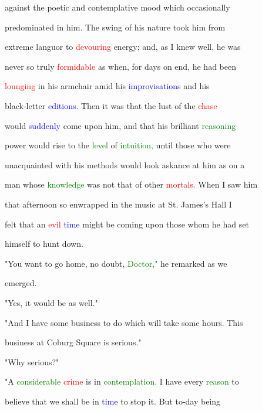 against the poetic and contemplative mood which occasionally

 predominated in him. The swing of his nature took him from

 extreme languor to \textcolor{red}{devouring} energy; and, as I knew well, he was

 never so truly \textcolor{red}{formidable} as when, for days on end, he had been

 \textcolor{red}{lounging} in his armchair amid his \textcolor{blue}{improvisations} and his

 black-letter \textcolor{blue}{editions.} Then it was that the \textcolor{BurntOrange}{lust} of the \textcolor{red}{chase}

 would \textcolor{blue}{suddenly} come upon him, and that his \textcolor{BurntOrange}{brilliant} \textcolor{green}{reasoning}

 power would rise to the \textcolor{green}{level} of \textcolor{green}{intuition,} until those who were

 unacquainted with his methods would look askance at him as on a

 man whose \textcolor{green}{knowledge} was not that of other \textcolor{red}{mortals.} When I saw him

 that afternoon so enwrapped in the \textcolor{BurntOrange}{music} at St. James's Hall I

 felt that an \textcolor{red}{evil} \textcolor{blue}{time} might be coming upon those whom he had set

 himself to hunt down.



 "You want to go home, no \textcolor{BurntOrange}{doubt,} \textcolor{green}{Doctor,"} he remarked as we

 emerged.



 "Yes, it would be as well."



 "And I have some business to do which will take some hours. This

 business at Coburg Square is serious."



 "Why serious?"



 "A \textcolor{green}{considerable} \textcolor{red}{crime} is in \textcolor{green}{contemplation.} I have every \textcolor{green}{reason} to

 believe that we shall be in \textcolor{blue}{time} to stop it. But to-day being

